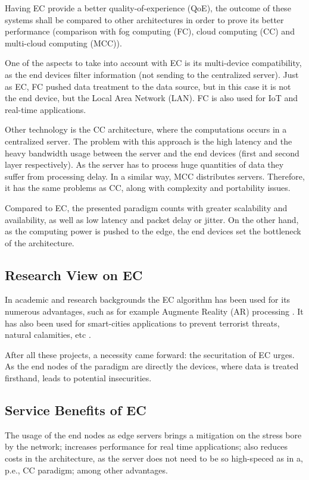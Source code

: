 \documentclass[10pt]{article}
\begin{document}
Having EC provide a better quality-of-experience (QoE), the outcome of these
systems shall be compared to other architectures in order to prove its better
performance (comparison with fog computing (FC), cloud computing (CC) and
multi-cloud computing (MCC)). 

One of the aspects to take into account with EC is its multi-device
compatibility, as the end devices filter information (not sending to the
centralized server). Just as EC, FC pushed data treatment to the data source,
but in this case it is not the end device, but the Local Area Network (LAN). FC
is also used for IoT and real-time applications.

Other technology is the CC architecture, where the computations occurs in a
centralized server. The problem with this approach is the high latency and the 
heavy bandwidth usage between the server and the end devices (first and second 
layer respectively). As the server has to process huge quantities of data they
suffer from processing delay. In a similar way, MCC distributes servers.
Therefore, it has the same problems as CC, along with complexity and portability
issues. 

Compared to EC, the presented paradigm counts with greater scalability
and availability, as well as low latency and packet delay or jitter. On the 
other hand, as the computing power is pushed to the edge, the end devices set 
the bottleneck of the architecture. \cite{artiot}

\subsection{Research View on EC}

In academic and research backgrounds the EC algorithm has been used for its
numerous advantages, such as for example Augmente Reality (AR) processing 
\cite{arapps}. It has also been used for smart-cities applications \cite{mec} 
to prevent terrorist threats, natural calamities, etc \cite{artiot}.

After all these projects, a necessity came forward: the securitation of EC
urges. As the end nodes of the paradigm are directly the devices, where data is
treated firsthand, leads to potential insecurities.

\subsection{Service Benefits of EC}

The usage of the end nodes as edge servers brings a mitigation on the stress
bore by the network; increases performance for real time applications; also
reduces costs in the architecture, as the server does not need to be so
high-speced as in a, p.e., CC paradigm; among other advantages.
\end{document}

